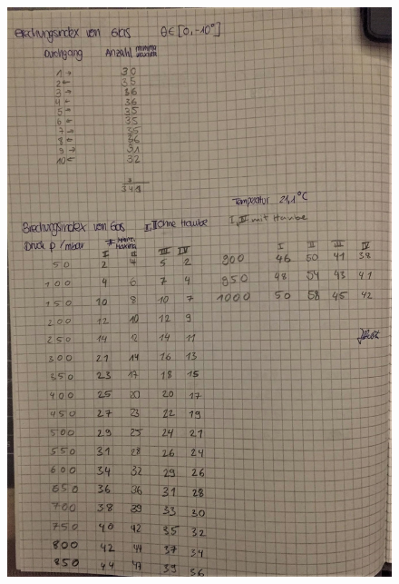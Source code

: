 \begin{figure}
    \includegraphics[width=\textwidth]{bilder/Messwerte_Anhang2.jpeg}
    \label{fig:originaldaten}
\end{figure}